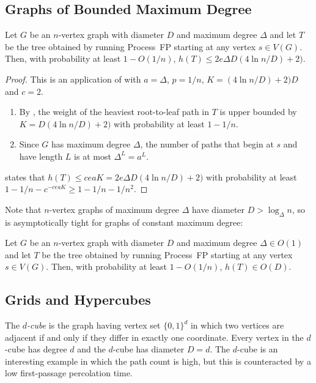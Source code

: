 \documentclass[lotsofwhite]{patmorin}
\begin{document}
\subsection{Graphs of Bounded Maximum Degree}

\begin{thm}
  Let $G$ be an $n$-vertex graph with diameter $D$ and maximum degree $\Delta$
  and let $T$ be the tree obtained by running Process~FP starting at
  any vertex $s\in V(G)$.  Then, with probability at least $1-O(1/n)$,
  $h(T)\le 2e\Delta D(4\ln n/D)+2)$.
\end{thm}

\begin{proof}
  This is an application of  with $a=\Delta$, $p=1/n$,
  $K=(4\ln n/D)+2)D$ and $c=2$.
  \begin{enumerate}
     \item By , the weight of the heaviest
       root-to-leaf path in $T$ is upper bounded by $K=D(4\ln n/D)+2)$ 
       with probability
       at least $1-1/n$.
     \item Since $G$ has maximum degree $\Delta$, the number of paths
       that begin at $s$ and have length $L$ is at most $\Delta^L=a^L$.
  \end{enumerate}
   states that $h(T)\le ceaK = 2e\Delta D(4\ln n/D)+2)$ with probability at least $1-1/n-c^{-ceaK}\ge 1-1/n-1/n^2$.
\end{proof}

Note that $n$-vertex graphs of maximum degree $\Delta$ have diameter
$D>\log_\Delta n$, so  is asymptotically
tight for graphs of constant maximum degree:

\begin{cor}
  Let $G$ be an $n$-vertex graph with diameter $D$ and maximum degree
  $\Delta\in O(1)$ and let $T$ be the tree obtained by running Process~FP
  starting at any vertex $s\in V(G)$.  Then, with probability at least
  $1-O(1/n)$, $h(T)\in O(D)$.
\end{cor}

\subsection{Grids and Hypercubes}

The \emph{$d$-cube} is the graph having vertex set $\{0,1\}^d$ in
which two vertices are adjacent if and only if they differ in exactly
one coordinate.  Every vertex in the $d$-cube has degree $d$ and the
$d$-cube has diameter $D=d$.  The $d$-cube is an interesting example
in which the path count is high, but this is counteracted by a low
first-passage percolation time.
\end{document}
